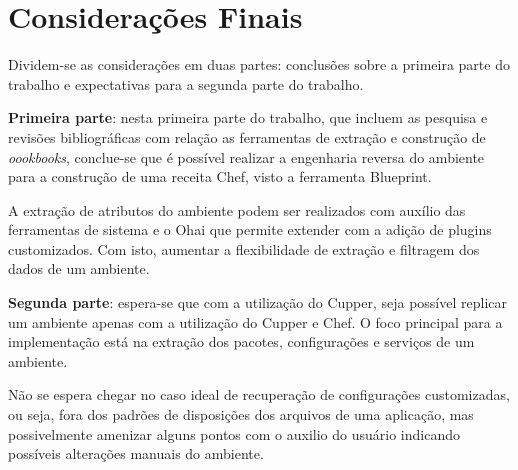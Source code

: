 \newpage\null\thispagestyle{empty}\newpage
\chapter{Considerações Finais}
\label{chap:result-parc}

Dividem-se as considerações em duas partes: conclusões
sobre a primeira parte do trabalho e expectativas para
a segunda parte do trabalho.

\textbf{Primeira parte}: nesta primeira parte do trabalho, que
incluem as pesquisa e revisões bibliográficas com relação
as ferramentas de extração e construção de \textit{oookbooks},
conclue-se que é possível realizar a engenharia reversa do
ambiente para a construção de uma receita Chef, visto a
ferramenta Blueprint.

A extração de atributos do ambiente podem ser realizados
com auxílio das ferramentas de sistema e o Ohai que permite
extender com a adição de plugins customizados. Com isto,
aumentar a flexibilidade de extração e filtragem dos dados
de um ambiente.

\textbf{Segunda parte}: espera-se que com a utilização do Cupper,
seja possível replicar um ambiente apenas com a utilização
do Cupper e Chef. O foco principal para a implementação
está na extração dos pacotes, configurações e serviços
de um ambiente.

Não se espera chegar no caso ideal de
recuperação de configurações customizadas, ou seja, fora
dos padrões de disposições dos arquivos de uma aplicação,
mas possivelmente amenizar alguns pontos com o auxilio do
usuário indicando possíveis alterações manuais do ambiente.


